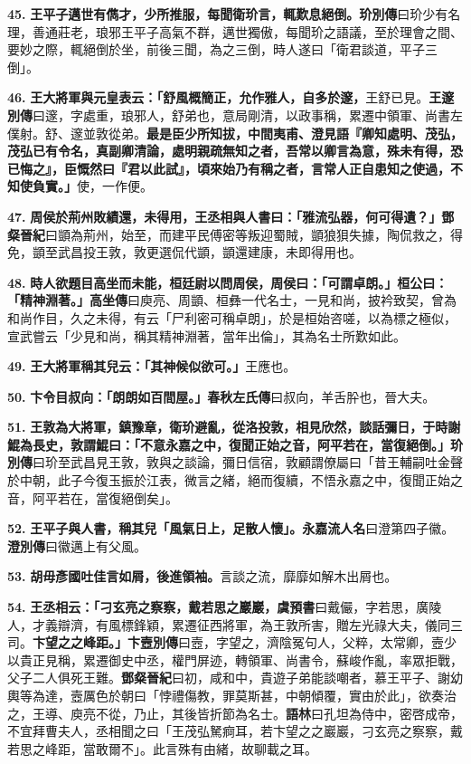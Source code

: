 \textbf{45.} \textbf{王平子邁世有儁才，少所推服，每聞衛玠言，輒歎息絕倒。}{\footnotesize \textbf{玠別傳}曰玠少有名理，善通莊老，琅邪王平子高氣不群，邁世獨傲，每聞玠之語議，至於理會之間、要妙之際，輒絕倒於坐，前後三聞，為之三倒，時人遂曰「衛君談道，平子三倒」。}

\textbf{46.} \textbf{王大將軍與元皇表云：「舒風概簡正，允作雅人，自多於邃，}{\footnotesize 王舒已見。\textbf{王邃別傳}曰邃，字處重，琅邪人，舒弟也，意局剛清，以政事稱，累遷中領軍、尚書左僕射。舒、邃並敦從弟。}\textbf{最是臣少所知拔，中間夷甫、澄見語『卿知處明、茂弘，茂弘已有令名，真副卿清論，處明親疏無知之者，吾常以卿言為意，殊未有得，恐已悔之』，臣慨然曰『君以此試』，頃來始乃有稱之者，言常人正自患知之使過，不知使負實。」}{\footnotesize 使，一作便。}

\textbf{47.} \textbf{周侯於荊州敗績還，未得用，王丞相與人書曰：「雅流弘器，何可得遺？」}{\footnotesize \textbf{鄧粲晉紀}曰顗為荊州，始至，而建平民傅密等叛迎蜀賊，顗狼狽失據，陶侃救之，得免，顗至武昌投王敦，敦更選侃代顗，顗還建康，未即得用也。}

\textbf{48.} \textbf{時人欲題目高坐而未能，桓廷尉以問周侯，周侯曰：「可謂卓朗。」桓公曰：「精神淵著。」}{\footnotesize \textbf{高坐傳}曰庾亮、周顗、桓彝一代名士，一見和尚，披衿致契，曾為和尚作目，久之未得，有云「尸利密可稱卓朗」，於是桓始咨嗟，以為標之極似，宣武嘗云「少見和尚，稱其精神淵著，當年出倫」，其為名士所歎如此。}

\textbf{49.} \textbf{王大將軍稱其兒云：「其神候似欲可。」}{\footnotesize 王應也。}

\textbf{50.} \textbf{卞令目叔向：「朗朗如百間屋。」}{\footnotesize \textbf{春秋左氏傳}曰叔向，羊舌肸也，晉大夫。}

\textbf{51.} \textbf{王敦為大將軍，鎮豫章，衛玠避亂，從洛投敦，相見欣然，談話彌日，于時謝鯤為長史，敦謂鯤曰：「不意永嘉之中，復聞正始之音，阿平若在，當復絕倒。」}{\footnotesize \textbf{玠別傳}曰玠至武昌見王敦，敦與之談論，彌日信宿，敦顧謂僚屬曰「昔王輔嗣吐金聲於中朝，此子今復玉振於江表，微言之緒，絕而復續，不悟永嘉之中，復聞正始之音，阿平若在，當復絕倒矣」。}

\textbf{52.} \textbf{王平子與人書，稱其兒「風氣日上，足散人懷」。}{\footnotesize \textbf{永嘉流人名}曰澄第四子徽。\textbf{澄別傳}曰徽邁上有父風。}

\textbf{53.} \textbf{胡毋彥國吐佳言如屑，後進領袖。}{\footnotesize 言談之流，靡靡如解木出屑也。}

\textbf{54.} \textbf{王丞相云：「刁玄亮之察察，戴若思之巖巖，}{\footnotesize \textbf{虞預書}曰戴儼，字若思，廣陵人，才義辯濟，有風標鋒穎，累遷征西將軍，為王敦所害，贈左光祿大夫，儀同三司。}\textbf{卞望之之峰距。」}{\footnotesize \textbf{卞壼別傳}曰壼，字望之，濟陰冤句人，父粹，太常卿，壼少以貴正見稱，累遷御史中丞，權門屏迹，轉領軍、尚書令，蘇峻作亂，率眾拒戰，父子二人俱死王難。\textbf{鄧粲晉紀}曰初，咸和中，貴遊子弟能談嘲者，慕王平子、謝幼輿等為達，壼厲色於朝曰「悖禮傷教，罪莫斯甚，中朝傾覆，實由於此」，欲奏治之，王導、庾亮不從，乃止，其後皆折節為名士。\textbf{語林}曰孔坦為侍中，密啓成帝，不宜拜曹夫人，丞相聞之曰「王茂弘駑痾耳，若卞望之之巖巖，刁玄亮之察察，戴若思之峰距，當敢爾不」。此言殊有由緒，故聊載之耳。}


